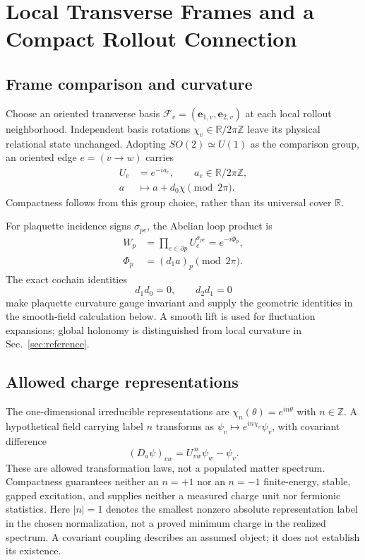 \documentclass[11pt]{article}
\begin{document}
\section{Local Transverse Frames and a Compact Rollout Connection}

\subsection{Frame comparison and curvature}

Choose an oriented transverse basis $\mathcal F_v=(\bm e_{1,v},\bm e_{2,v})$ at each local rollout neighborhood. Independent basis rotations $\chi_v\in\mathbb R/2\pi\mathbb Z$ leave its physical relational state unchanged. Adopting $SO(2)\simeq U(1)$ as the comparison group, an oriented edge $e=(v\to w)$ carries
\begin{equation}
\begin{aligned}
U_e&=e^{-ia_e},\qquad a_e\in\mathbb R/2\pi\mathbb Z,\\
a&\mapsto a+d_0\chi\pmod{2\pi}.
\end{aligned}
\end{equation}
Compactness follows from this group choice, rather than its universal cover $\mathbb R$.

For plaquette incidence signs $\sigma_{pe}$, the Abelian loop product is
\begin{equation}
\begin{aligned}
W_p&=\prod_{e\in\partial p}U_e^{\sigma_{pe}}=e^{-i\Phi_p},\\
\Phi_p&=(d_1a)_p\pmod{2\pi}.
\end{aligned}
\end{equation}
The exact cochain identities
\begin{equation}
d_1d_0=0,\qquad d_2d_1=0
\end{equation}
make plaquette curvature gauge invariant and supply the geometric identities in the smooth-field calculation below. A smooth lift is used for fluctuation expansions; global holonomy is distinguished from local curvature in Sec.~\ref{sec:reference}.

\subsection{Allowed charge representations}
\label{sec:representations}

The one-dimensional irreducible representations are $\chi_n(\theta)=e^{in\theta}$ with $n\in\mathbb Z$. A hypothetical field carrying label $n$ transforms as $\psi_v\mapsto e^{in\chi_v}\psi_v$, with covariant difference
\begin{equation}
(D_a\psi)_{vw}=U_{vw}^{\,n}\psi_w-\psi_v.
\end{equation}
These are allowed transformation laws, not a populated matter spectrum. Compactness guarantees neither an $n=+1$ nor an $n=-1$ finite-energy, stable, gapped excitation, and supplies neither a measured charge unit nor fermionic statistics. Here $|n|=1$ denotes the smallest nonzero absolute representation label in the chosen normalization, not a proved minimum charge in the realized spectrum. A covariant coupling describes an assumed object; it does not establish its existence.
\end{document}
